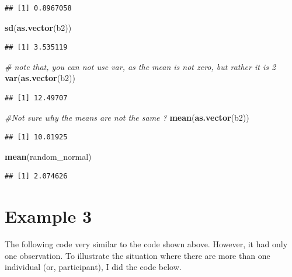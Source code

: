 \documentclass[]{book}
\newenvironment{Shaded}{\begin{snugshade}}{\end{snugshade}}
\newcommand{\CommentTok}[1]{\textcolor[rgb]{0.56,0.35,0.01}{\textit{#1}}}
\newcommand{\KeywordTok}[1]{\textcolor[rgb]{0.13,0.29,0.53}{\textbf{#1}}}
\newcommand{\NormalTok}[1]{#1}
\begin{document}
\begin{verbatim}
## [1] 0.8967058
\end{verbatim}

\begin{Shaded}
\begin{Highlighting}[]
\KeywordTok{sd}\NormalTok{(}\KeywordTok{as.vector}\NormalTok{(b2))}
\end{Highlighting}
\end{Shaded}

\begin{verbatim}
## [1] 3.535119
\end{verbatim}

\begin{Shaded}
\begin{Highlighting}[]
\CommentTok{# note that, you can not use var, as the mean is not zero, but rather it is 2}
\KeywordTok{var}\NormalTok{(}\KeywordTok{as.vector}\NormalTok{(b2))}
\end{Highlighting}
\end{Shaded}

\begin{verbatim}
## [1] 12.49707
\end{verbatim}

\begin{Shaded}
\begin{Highlighting}[]
\CommentTok{#Not sure why the means are not the same ?}
\KeywordTok{mean}\NormalTok{(}\KeywordTok{as.vector}\NormalTok{(b2))}
\end{Highlighting}
\end{Shaded}

\begin{verbatim}
## [1] 10.01925
\end{verbatim}

\begin{Shaded}
\begin{Highlighting}[]
\KeywordTok{mean}\NormalTok{(random_normal)}
\end{Highlighting}
\end{Shaded}

\begin{verbatim}
## [1] 2.074626
\end{verbatim}

\hypertarget{example-3}{%
\section{Example 3}\label{example-3}}

The following code very similar to the code shown above. However, it had only one observation. To illustrate the situation where there are more than one individual (or, participant), I did the code below.
\end{document}
